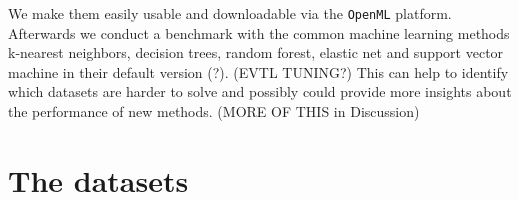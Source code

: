 \documentclass[a4paper]{article}
\begin{document}
We make them easily usable and downloadable via the \texttt{OpenML} platform.  
Afterwards we conduct a benchmark with the common machine learning methods k-nearest neighbors, decision trees, random forest, elastic net and support vector machine in their default version (?). (EVTL TUNING?) 
This can help to identify which datasets are harder to solve and possibly could provide more insights about the performance of new methods. (MORE OF THIS in Discussion)

  

\section{The datasets}
\end{document}
